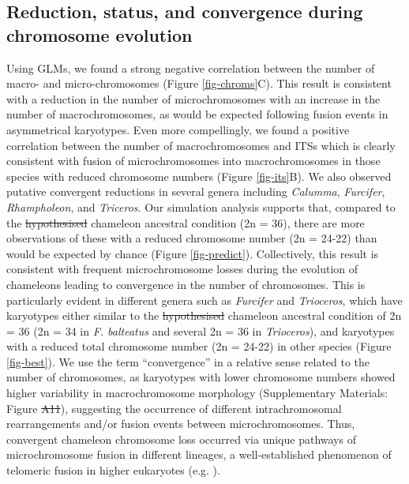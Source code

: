 \documentclass[a4paper, 12pt]{article}
\providecommand{\DIFadd}[1]{{\protect\color{blue}\uwave{#1}}} %
\providecommand{\DIFdel}[1]{{\protect\color{red}\sout{#1}}}                      %
\providecommand{\DIFaddbegin}{} %
\providecommand{\DIFaddend}{} %
\providecommand{\DIFdelbegin}{} %
\providecommand{\DIFdelend}{} %
\newcommand{\DIFscaledelfig}{0.5}
\newlength{\DIFdelgraphicswidth} %
\newlength{\DIFdelgraphicsheight} %
\newcommand{\DIFaddincludegraphics}[2][]{{\color{blue}\fbox{\DIFOincludegraphics[#1]{#2}}}} %
\newcommand{\DIFdelincludegraphics}[2][]{%
\sbox{\DIFdelgraphicsbox}{\DIFOincludegraphics[#1]{#2}}%
\settoboxwidth{\DIFdelgraphicswidth}{\DIFdelgraphicsbox} %
\settoboxtotalheight{\DIFdelgraphicsheight}{\DIFdelgraphicsbox} %
\scalebox{\DIFscaledelfig}{%
\parbox[b]{\DIFdelgraphicswidth}{\usebox{\DIFdelgraphicsbox}\\[-\baselineskip] \rule{\DIFdelgraphicswidth}{0em}}\llap{\resizebox{\DIFdelgraphicswidth}{\DIFdelgraphicsheight}{%
\setlength{\unitlength}{\DIFdelgraphicswidth}%
\begin{picture}(1,1)%
\thicklines\linethickness{2pt} %
{\color[rgb]{1,0,0}\put(0,0){\framebox(1,1){}}}%
{\color[rgb]{1,0,0}\put(0,0){\line( 1,1){1}}}%
{\color[rgb]{1,0,0}\put(0,1){\line(1,-1){1}}}%
\end{picture}%
}\hspace*{3pt}}} %
} %
\DeclareRobustCommand{\DIFaddbegin}{\DIFOaddbegin \let\includegraphics\DIFaddincludegraphics} %
\DeclareRobustCommand{\DIFaddend}{\DIFOaddend \let\includegraphics\DIFOincludegraphics} %
\DeclareRobustCommand{\DIFdelbegin}{\DIFOdelbegin \let\includegraphics\DIFdelincludegraphics} %
\DeclareRobustCommand{\DIFdelend}{\DIFOaddend \let\includegraphics\DIFOincludegraphics} %
\begin{document}
\subsection{Reduction, status, and convergence during chromosome evolution}
Using GLMs, we found a strong negative correlation between the number of macro- and micro-chromosomes (Figure \ref{fig-chroms}C). 
This result is consistent with a reduction in the number of microchromosomes with an increase in the number of macrochromosomes, as would be expected following fusion events in asymmetrical karyotypes. 
Even more compellingly, we found a positive correlation between the number of macrochromosomes and ITSs which is clearly consistent with fusion of microchromosomes into macrochromosomes in those species with reduced chromosome numbers (Figure \ref{fig-its}B). 
We also observed putative convergent reductions in several genera including \textit{Calumma}, \textit{Furcifer}, \textit{Rhampholeon}, and \textit{Triceros}. 
Our simulation analysis supports that, compared to the \DIFdelbegin \DIFdel{hypothesised }\DIFdelend \DIFaddbegin \DIFadd{hypothesized }\DIFaddend chameleon ancestral condition (2n = 36), there are more observations of these with a reduced chromosome number (2n = 24-22) than would be expected by chance (Figure \ref{fig-predict}). 
Collectively, this result is consistent with frequent microchromosome losses during the evolution of chameleons leading to convergence in the number of chromosomes. 
This is particularly evident in different genera such as \textit{Furcifer} and \textit{Trioceros}, which have karyotypes either similar to the \DIFdelbegin \DIFdel{hypothesised }\DIFdelend \DIFaddbegin \DIFadd{hypothesized }\DIFaddend chameleon ancestral condition of 2n = 36 (2n = 34 in \textit{F. balteatus} and several 2n = 36 in \textit{Trioceros}), and karyotypes with a reduced total chromosome number (2n = 24-22) in other species (Figure \ref{fig-best}). 
We use the term ``convergence'' in a relative sense related to the number of chromosomes, as karyotypes with lower chromosome numbers showed higher variability in macrochromosome morphology (Supplementary Materials: Figure \DIFdelbegin \DIFdel{A11}\DIFdelend \DIFaddbegin \DIFadd{A10}\DIFaddend ), suggesting the occurrence of different intrachromosomal rearrangements and/or fusion events between microchromosomes. 
Thus, convergent chameleon chromosome loss occurred via unique pathways of microchromosome fusion in different lineages, a well-established phenomenon of telomeric fusion in higher eukaryotes (e.g. \citealt{heacock2004molecular}).  
\end{document}
